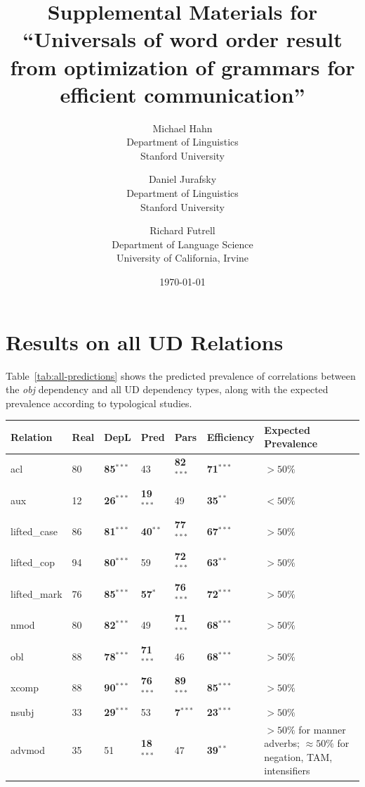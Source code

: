 \documentclass[12pt]{article}
\title{Supplemental Materials for ``Universals of word order result from optimization of grammars for efficient communication''}
\author{
        Michael Hahn \\
                Department of Linguistics\\
       Stanford University
            \and
       Daniel Jurafsky\\
       Department of Linguistics\\
       Stanford University \\
       \and
       Richard Futrell\\
       Department of Language Science\\
       University of California, Irvine
}
\date{\today}
\begin{document}
\maketitle

\section{Results on all UD Relations}
Table~\ref{tab:all-predictions} shows the predicted prevalence of correlations between the \emph{obj} dependency and all UD dependency types, along with the expected prevalence according to typological studies.

\begin{table} %
	\begin{center}
	
\tiny{
\begin{tabular}{|l|l|l|ll|l|l|}
	\hline
	Relation & Real & DepL & Pred & Pars & Efficiency & Expected Prevalence  \\ \hline
acl  &  80   &   \textbf{85}$^{***}$   &   43   &   \textbf{82}$^{***}$   &   \textbf{71}$^{***}$  & $>50\%$  \citep{dryer1992greenbergian} \\
aux  &  12   &   \textbf{26}$^{***}$   &   \textbf{19}$^{***}$   &   49   &   \textbf{35}$^{**}$  & $<50\%$ \citep{dryer1992greenbergian} \\
lifted\_case  &  86   &   \textbf{81}$^{***}$   &   \textbf{40}$^{**}$   &   \textbf{77}$^{***}$   &   \textbf{67}$^{***}$ & $> 50 \%$ \citep{dryer1992greenbergian}  \\
lifted\_cop  &  94   &   \textbf{80}$^{***}$   &   59   &   \textbf{72}$^{***}$   &   \textbf{63}$^{**}$  & $> 50 \%$ \citep{dryer1992greenbergian} \\
lifted\_mark  &  76   &   \textbf{85}$^{***}$   &   \textbf{57}$^{*}$   &   \textbf{76}$^{***}$   &   \textbf{72}$^{***}$  & $> 50 \%$ \citep{dryer1992greenbergian} \\
nmod  &  80   &   \textbf{82}$^{***}$   &   49   &   \textbf{71}$^{***}$   &   \textbf{68}$^{***}$  & $> 50 \%$ \citep{dryer1992greenbergian} \\ 
obl  &  88   &   \textbf{78}$^{***}$   &   \textbf{71}$^{***}$   &   46   &   \textbf{68}$^{***}$  &  $> 50 \%$ \citep{dryer1992greenbergian} \\
xcomp  &  88   &   \textbf{90}$^{***}$   &   \textbf{76}$^{***}$   &   \textbf{89}$^{***}$   &   \textbf{85}$^{***}$  &  $> 50 \%$ \citep{dryer1992greenbergian} \\
\hdashline
nsubj  &  33   &   \textbf{29}$^{***}$   &   53   &   \textbf{7}$^{***}$   &   \textbf{23}$^{***}$  & $> 50 \%$ \citep{dryer1992greenbergian} \\
advmod  &  35   &   51   &   \textbf{18}$^{***}$   &   47   &   \textbf{39}$^{**}$  & $>50\%$ for manner adverbs; $\approx 50\%$ for negation, TAM, intensifiers \citep{dryer1992greenbergian} \\


\end{tabular}}
\end{center}
\end{table}
\end{document}
